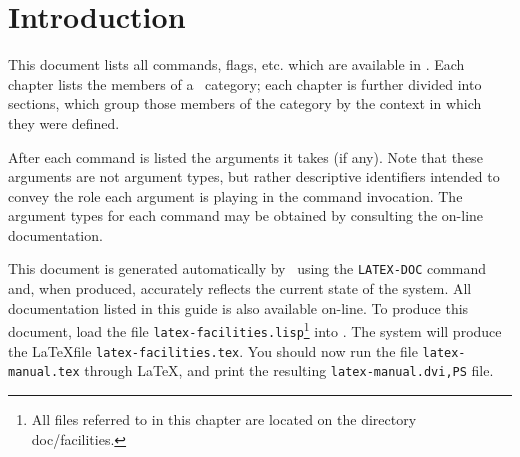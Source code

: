 \chapter{Introduction}

This document lists all commands, flags, etc. which are available in \TPS.
Each chapter lists the members of a \TPS~category; each chapter is further
divided into sections, which group those members of the category by
the context in which they were defined.

After each command is listed the arguments it takes (if any).  Note that
these arguments are not argument types, but rather descriptive identifiers
intended to convey the role each argument is playing in the command 
invocation.  The argument types for each command may be obtained by
consulting the on-line documentation.

This document is generated automatically by \TPS~using the \texttt{LATEX-DOC}
command and, when produced, accurately reflects the current state of
the system. All documentation listed in this guide is also available on-line.
To produce this document, load the file \texttt{latex-facilities.lisp}\footnote{All
files referred to in this chapter are located on the directory
doc/facilities.}
into \TPS. The system will produce the \LaTeX file \texttt{latex-facilities.tex}.
You should now run the file \texttt{latex-manual.tex} through \LaTeX , and print the
resulting \texttt{latex-manual.{dvi,PS}} file.
